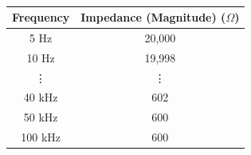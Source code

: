 	\begin{table}[H]
		\centering
		\caption{\jadual}
		\begin{tabular}{cc}
			\toprule
			\multicolumn{1}{l}{\textbf{Frequency}} & \multicolumn{1}{l}{\textbf{Impedance (Magnitude) ($\Omega$)}} \\
			\midrule
			5 Hz  & 20,000 \\
			10 Hz & 19,998 \\
			\vdots     & \vdots \\
			40 kHz & 602 \\
			50 kHz & 600 \\
			100 kHz & 600 \\
			\bottomrule
		\end{tabular}%
		\label{table:freqmag}%
	\end{table}%
\listclose %

